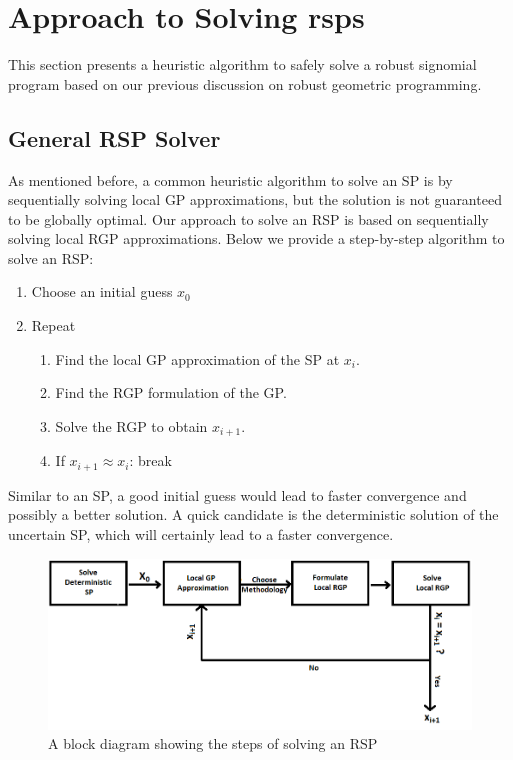 \section{Approach to Solving \gls{rsp}s}

This section presents a heuristic algorithm to safely solve a robust signomial program based on our previous discussion on robust geometric programming. 

\subsection{General RSP Solver}
As mentioned before, a common heuristic algorithm to solve an SP is by sequentially solving local GP approximations, but the solution is not guaranteed to be globally optimal. Our approach to solve an RSP is based on sequentially solving local RGP approximations. Below we provide a step-by-step algorithm to solve an RSP:

\begin{enumerate}
    \item Choose an initial guess $x_0$
    \item Repeat
    \begin{enumerate}
        \item Find the local GP approximation of the SP at $x_i$.
        \item Find the RGP formulation of the GP.
        \item Solve the RGP to obtain $x_{i+1}$.
        \item If $x_{i+1} \approx x_{i}$: break
    \end{enumerate}
\end{enumerate}

Similar to an SP, a good initial guess would lead to faster convergence and possibly a better solution. A quick candidate is the deterministic solution of the uncertain SP, which will certainly lead to a faster convergence.

\begin{figure}[h]
    \centering
    \includegraphics[scale=0.6]{sp_solve.png}
    \caption{A block diagram showing the steps of solving an RSP}
    \label{fig:solve_rsp_diag}
\end{figure}

